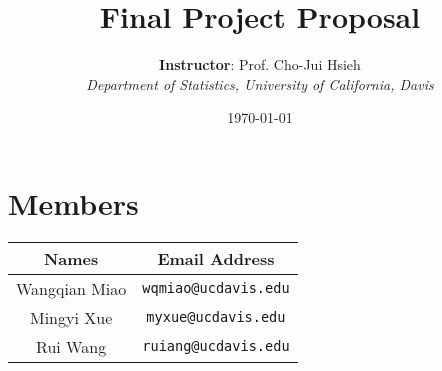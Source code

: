 \documentclass[a4paper,11pt,onecolumn,twoside]{article}
\title{\Large \textbf{Final Project Proposal}}
\author{
\textbf{Instructor}: Prof. Cho-Jui Hsieh\\[2pt]
{\large \textit{Department of Statistics, University of California, Davis}}\\[2pt]
}
\date{\today}
\begin{document}
\maketitle
\thispagestyle{firststyle}
\setlength{\oddsidemargin}{ 1cm}
\setlength{\evensidemargin}{\oddsidemargin}
\setlength{\textwidth}{15.50cm}
\vspace{-.8cm}
\setcounter{page}{1}
\setlength{\oddsidemargin}{-.5cm}  %
\setlength{\evensidemargin}{\oddsidemargin}
\setlength{\textwidth}{17.00cm}
\section{Members}
\begin{table}[H]
	\centering
	\begin{tabular}{cc}
		\hline
		\textbf{Names} & \textbf{Email Address}\\
		\hline
		Wangqian Miao&\texttt{wqmiao@ucdavis.edu}\\
		Mingyi Xue & \texttt{myxue@ucdavis.edu}\\
		Rui Wang&\texttt{ruiang@ucdavis.edu} \\
		\hline
	\end{tabular}
\end{table}
\end{document}
